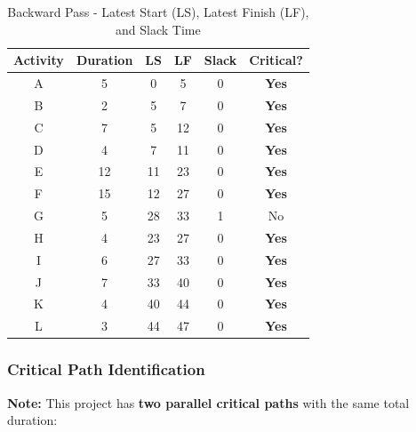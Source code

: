 \documentclass[12pt,a4paper]{article}
\begin{document}
\begin{table}[H]
\centering
\begin{tabular}{|c|c|c|c|c|c|}
\hline
\textbf{Activity} & \textbf{Duration} & \textbf{LS} & \textbf{LF} & \textbf{Slack} & \textbf{Critical?} \\
\hline
A & 5 & 0 & 5 & 0 & \textbf{Yes} \\
\hline
B & 2 & 5 & 7 & 0 & \textbf{Yes} \\
\hline
C & 7 & 5 & 12 & 0 & \textbf{Yes} \\
\hline
D & 4 & 7 & 11 & 0 & \textbf{Yes} \\
\hline
E & 12 & 11 & 23 & 0 & \textbf{Yes} \\
\hline
F & 15 & 12 & 27 & 0 & \textbf{Yes} \\
\hline
G & 5 & 28 & 33 & 1 & No \\
\hline
H & 4 & 23 & 27 & 0 & \textbf{Yes} \\
\hline
I & 6 & 27 & 33 & 0 & \textbf{Yes} \\
\hline
J & 7 & 33 & 40 & 0 & \textbf{Yes} \\
\hline
K & 4 & 40 & 44 & 0 & \textbf{Yes} \\
\hline
L & 3 & 44 & 47 & 0 & \textbf{Yes} \\
\hline
\end{tabular}
\caption{Backward Pass - Latest Start (LS), Latest Finish (LF), and Slack Time}
\end{table}

\subsubsection{Critical Path Identification}

\textbf{Note:} This project has \textbf{two parallel critical paths} with the same total duration:

\vspace{0.3cm}
\noindent{}
\end{document}
